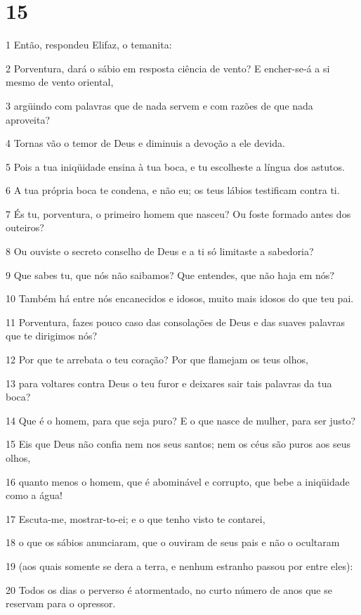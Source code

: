 \chapter{15}

\par 1 Então, respondeu Elifaz, o temanita:
\par 2 Porventura, dará o sábio em resposta ciência de vento? E encher-se-á a si mesmo de vento oriental,
\par 3 argüindo com palavras que de nada servem e com razões de que nada aproveita?
\par 4 Tornas vão o temor de Deus e diminuis a devoção a ele devida.
\par 5 Pois a tua iniqüidade ensina à tua boca, e tu escolheste a língua dos astutos.
\par 6 A tua própria boca te condena, e não eu; os teus lábios testificam contra ti.
\par 7 És tu, porventura, o primeiro homem que nasceu? Ou foste formado antes dos outeiros?
\par 8 Ou ouviste o secreto conselho de Deus e a ti só limitaste a sabedoria?
\par 9 Que sabes tu, que nós não saibamos? Que entendes, que não haja em nós?
\par 10 Também há entre nós encanecidos e idosos, muito mais idosos do que teu pai.
\par 11 Porventura, fazes pouco caso das consolações de Deus e das suaves palavras que te dirigimos nós?
\par 12 Por que te arrebata o teu coração? Por que flamejam os teus olhos,
\par 13 para voltares contra Deus o teu furor e deixares sair tais palavras da tua boca?
\par 14 Que é o homem, para que seja puro? E o que nasce de mulher, para ser justo?
\par 15 Eis que Deus não confia nem nos seus santos; nem os céus são puros aos seus olhos,
\par 16 quanto menos o homem, que é abominável e corrupto, que bebe a iniqüidade como a água!
\par 17 Escuta-me, mostrar-to-ei; e o que tenho visto te contarei,
\par 18 o que os sábios anunciaram, que o ouviram de seus pais e não o ocultaram
\par 19 (aos quais somente se dera a terra, e nenhum estranho passou por entre eles):
\par 20 Todos os dias o perverso é atormentado, no curto número de anos que se reservam para o opressor.
